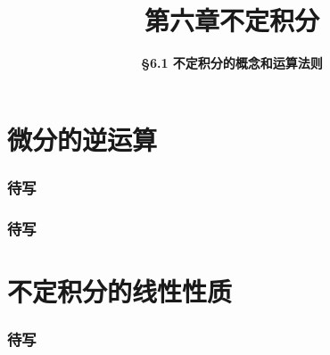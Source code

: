 \everymath{\displaystyle}



\title[第六章\\
不定积分]{\texorpdfstring{\LARGE \bfseries 第六章\quad 不定积分}{第六章 不定积分}} %
\author[\smaller \S 6.1\\
不定积分概念和运算] %
{\Large \bfseries \S 6.1 不定积分的概念和运算法则}
\date{}





\begin{frame}

\titlepage %

\end{frame}



\section{微分的逆运算}


\begin{frame}
\frametitle{待写}

\end{frame}


\begin{frame}
\frametitle{待写}

\end{frame}


\section{不定积分的线性性质}


\begin{frame}
\frametitle{待写}

\end{frame}



